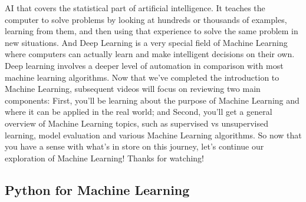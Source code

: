 AI that covers the statistical part of artificial intelligence. It teaches the computer to solve problems by looking at hundreds or thousands of examples, learning from them, and then using that experience to solve the same problem in new situations. And Deep Learning is a very special field of Machine Learning where computers can actually learn and make intelligent decisions on their own. Deep learning involves a deeper level of automation in comparison with most machine learning algorithms. Now that we’ve completed the introduction to Machine Learning, subsequent videos will focus on reviewing two main components: First, you’ll be learning about the purpose of Machine Learning and where it can be applied in the real world; and Second, you’ll get a general overview of Machine Learning topics, such as supervised vs unsupervised learning, model evaluation and various Machine Learning algorithms. So now that you have a sense with what’s in store on this journey, let’s continue our exploration of Machine Learning! Thanks for watching!
	
	\subsection{Python for Machine Learning}	
	
